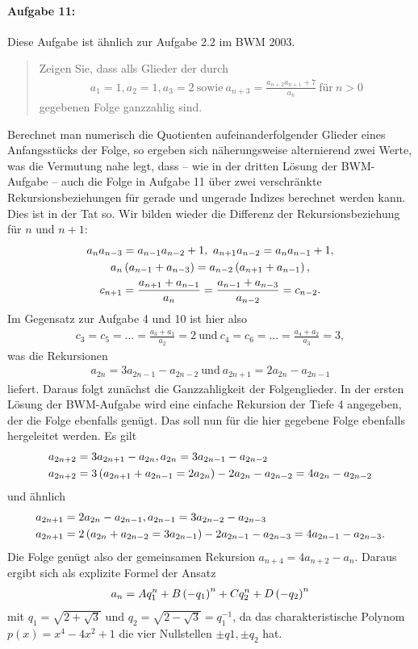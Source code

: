 \documentclass[11pt,a4paper]{article}
\begin{document}
\paragraph{Aufgabe 11:}
Diese Aufgabe ist ähnlich zur Aufgabe 2.2 im BWM 2003. 
\begin{quote}
  Zeigen Sie, dass alls Glieder der durch 
  \begin{gather*}
    a_1=1, a_2=1, a_3=2\ \text{sowie}\ a_{n+3}=\frac{a_{n+2}a_{n+1}+7}{a_n}\
    \text{für}\ n>0 
  \end{gather*}
  gegebenen Folge ganzzahlig sind.  
\end{quote}
Berechnet man numerisch die Quotienten aufeinanderfolgender Glieder eines
Anfangsstücks der Folge, so ergeben sich näherungsweise alternierend zwei
Werte, was die Vermutung nahe legt, dass -- wie in der dritten Lösung der
BWM-Aufgabe -- auch die Folge in Aufgabe 11 über zwei verschränkte
Rekursionsbeziehungen für gerade und ungerade Indizes berechnet werden kann.
Dies ist in der Tat so. Wir bilden wieder die Differenz der
Rekursionsbeziehung für $n$ und $n+1$:
\begin{gather*}
  a_na_{n-3}=a_{n-1}a_{n-2}+1,\ a_{n+1}a_{n-2}=a_na_{n-1}+1,\\
  a_n\left(a_{n-1}+a_{n-3}\right)=a_{n-2}\left(a_{n+1}+a_{n-1}\right),\\
  c_{n+1}=\frac{a_{n+1}+a_{n-1}}{a_n}=\frac{a_{n-1}+a_{n-3}}{a_{n-2}}=c_{n-2}.
\end{gather*}
Im Gegensatz zur Aufgabe 4 und 10 ist hier also
\begin{gather*}
  c_3=c_5=\dots=\frac{a_3+a_1}{a_2}=2\ \text{und}\
  c_4=c_6=\dots=\frac{a_4+a_2}{a_3}=3, 
\end{gather*}
was die Rekursionen
\begin{gather*}
  a_{2n}=3a_{2n-1}-a_{2n-2}\ \text{und}\ a_{2n+1}=2a_{2n}-a_{2n-1}
\end{gather*}
liefert.  Daraus folgt zunächst die Ganzzahligkeit der Folgenglieder.  In der
ersten Lösung der BWM-Aufgabe wird eine einfache Rekursion der Tiefe 4
angegeben, der die Folge ebenfalls genügt.  Das soll nun für die hier gegebene
Folge ebenfalls hergeleitet werden.  Es gilt
\begin{align*}
  a_{2n+2}&=3a_{2n+1}-a_{2n}, a_{2n}=3a_{2n-1}-a_{2n-2}\\
  a_{2n+2}&=3\left(a_{2n+1}+a_{2n-1}=2a_{2n}\right)-2a_{2n}-a_{2n-2}=4a_{2n}-a_{2n-2} 
\end{align*}
und ähnlich
\begin{align*}
  a_{2n+1}&=2a_{2n}-a_{2n-1}, a_{2n-1}=3a_{2n-2}-a_{2n-3}\\
  a_{2n+1}&=2\left(a_{2n}+a_{2n-2}=3a_{2n-1}\right)-2a_{2n-1}-a_{2n-3}=4a_{2n-1}-a_{2n-3}.
\end{align*}
Die Folge genügt also der gemeinsamen Rekursion $a_{n+4}=4a_{n+2}-a_n$.
Daraus ergibt sich als explizite Formel der Ansatz 
\begin{gather*}
  a_n=Aq_1^n+B\left(-q_1\right)^n+Cq_2^n+D\left(-q_2\right)^n
\end{gather*}
mit $q_1=\sqrt{2+\sqrt{3}}$ und $q_2=\sqrt{2-\sqrt{3}}=q_1^{-1}$, da das
charakteristische Polynom $p(x)=x^4-4x^2+1$ die vier Nullstellen $\pm q1, \pm
q_2$ hat. 
\end{document}
